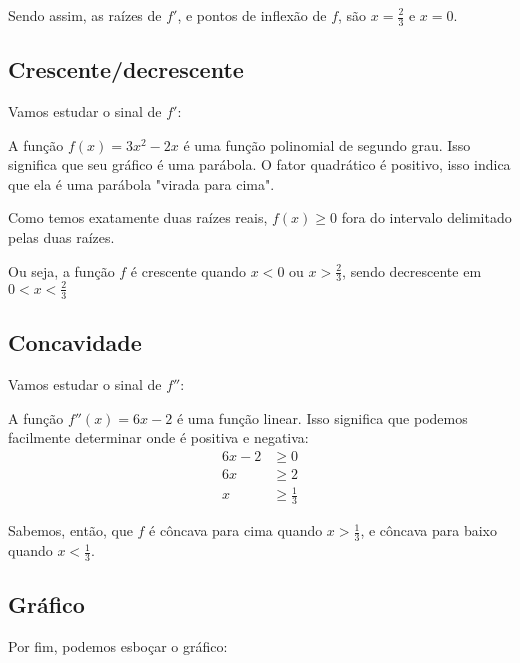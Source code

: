 \documentclass[12pt]{article}
\theoremstyle{definition}
\begin{document}
Sendo assim, as raízes de \(f'\), e pontos de inflexão de \(f\), são \(x = \frac{2}{3}\) e \(x = 0\).
\subsection{Crescente/decrescente}
Vamos estudar o sinal de \(f'\):

A função \(f(x) = 3x^2-2x\) é uma função polinomial de segundo grau. Isso significa que seu gráfico é uma parábola. O fator quadrático é positivo, isso indica que ela é uma parábola "virada para cima".

Como temos exatamente duas raízes reais, \(f(x) \geq 0\) fora do intervalo delimitado pelas duas raízes.

Ou seja, a função \(f\) é crescente quando \(x < 0\) ou \(x > \frac{2}{3}\), sendo decrescente em \(0 < x < \frac{2}{3}\)
\subsection{Concavidade}
Vamos estudar o sinal de \(f''\):

A função \(f''(x) = 6x - 2\) é uma função linear. Isso significa que podemos facilmente determinar onde é positiva e negativa:
\begin{align*}
    6x - 2 &\geq 0 \\
    6x &\geq 2 \\
    x &\geq \frac{1}{3}
\end{align*}

Sabemos, então, que \(f\) é côncava para cima quando \(x > \frac{1}{3}\), e côncava para baixo quando \(x < \frac{1}{3}\).
\subsection{Gráfico}
Por fim, podemos esboçar o gráfico:

\end{document}

